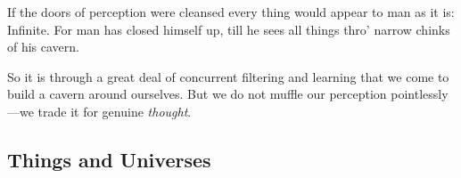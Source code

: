 \begin{displayquote}
	If the doors of perception were cleansed every thing would appear to man as it is: Infinite. For man has closed himself up, till he sees all things thro' narrow chinks of his cavern. \\
\end{displayquote}

So it is through a great deal of concurrent filtering and learning that we come to build a cavern around ourselves. But we do not muffle our perception pointlessly---we trade it for genuine \textit{thought}. \\



\subsection{Things and Universes}











